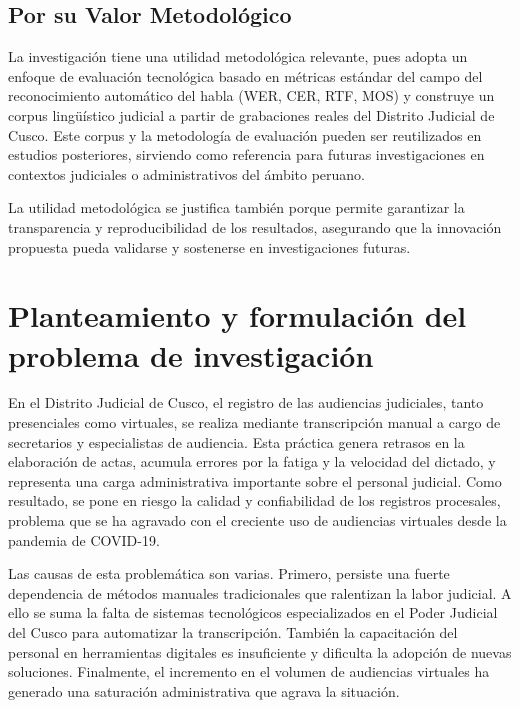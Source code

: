 \documentclass[12pt,a4paper,oneside]{article}
\begin{document}
\subsection{Por su Valor Metodol\'ogico}

La investigaci\'on tiene una utilidad metodol\'ogica relevante, pues adopta un enfoque de evaluaci\'on tecnol\'ogica basado en m\'etricas est\'andar del campo del reconocimiento autom\'atico del habla (WER, CER, RTF, MOS) y construye un corpus ling\"u\'istico judicial a partir de grabaciones reales del Distrito Judicial de Cusco. Este corpus y la metodolog\'ia de evaluaci\'on pueden ser reutilizados en estudios posteriores, sirviendo como referencia para futuras investigaciones en contextos judiciales o administrativos del \'ambito peruano.

La utilidad metodol\'ogica se justifica tambi\'en porque permite garantizar la transparencia y reproducibilidad de los resultados, asegurando que la innovaci\'on propuesta pueda validarse y sostenerse en investigaciones futuras.


\section{Planteamiento y formulaci\'on del problema de investigaci\'on}

En el Distrito Judicial de Cusco, el registro de las audiencias judiciales, tanto presenciales como virtuales, se realiza mediante transcripci\'on manual a cargo de secretarios y especialistas de audiencia. Esta pr\'actica genera retrasos en la elaboraci\'on de actas, acumula errores por la fatiga y la velocidad del dictado, y representa una carga administrativa importante sobre el personal judicial. Como resultado, se pone en riesgo la calidad y confiabilidad de los registros procesales, problema que se ha agravado con el creciente uso de audiencias virtuales desde la pandemia de COVID-19.

Las causas de esta problem\'atica son varias. Primero, persiste una fuerte dependencia de m\'etodos manuales tradicionales que ralentizan la labor judicial. A ello se suma la falta de sistemas tecnol\'ogicos especializados en el Poder Judicial del Cusco para automatizar la transcripci\'on. Tambi\'en la capacitaci\'on del personal en herramientas digitales es insuficiente y dificulta la adopci\'on de nuevas soluciones. Finalmente, el incremento en el volumen de audiencias virtuales ha generado una saturaci\'on administrativa que agrava la situaci\'on.
\end{document}
